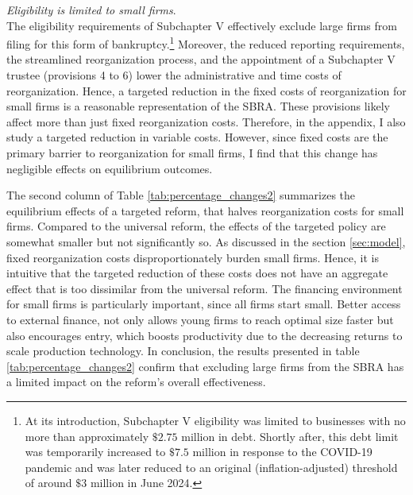 \documentclass[12pt]{article}
\begin{document}
\noindent \textit{Eligibility is limited to small firms}. \\ 
The eligibility requirements of Subchapter V effectively exclude large firms from filing for this form of bankruptcy.\footnote{At its introduction, Subchapter V eligibility was limited to businesses with no more than approximately $\$2.75$ million in debt. Shortly after, this debt limit was temporarily increased to $\$7.5$ million in response to the COVID-19 pandemic and was later reduced to an original (inflation-adjusted) threshold of around $\$3$ million in June 2024.} Moreover, the reduced reporting requirements, the streamlined reorganization process, and the appointment of a Subchapter V trustee (provisions 4 to 6) lower the administrative and time costs of reorganization. Hence, a targeted reduction in the fixed costs of reorganization for small firms is a reasonable representation of the SBRA. These provisions likely affect more than just fixed reorganization costs. Therefore, in the appendix, I also study a targeted reduction in variable costs. However, since fixed costs are the primary barrier to reorganization for small firms, I find that this change has negligible effects on equilibrium outcomes.

The second column of Table \ref{tab:percentage_changes2} summarizes the equilibrium effects of a targeted reform, that halves reorganization costs for small firms. Compared to the universal reform, the effects of the targeted policy are somewhat smaller but not significantly so. As discussed in the section \ref{sec:model}, fixed reorganization costs disproportionately burden small firms. Hence, it is intuitive that the targeted reduction of these costs does not have an aggregate effect that is too dissimilar from the universal reform. The financing environment for small firms is particularly important, since all firms start small. Better access to external finance, not only allows young firms to reach optimal size faster but also encourages entry, which boosts productivity due to the decreasing returns to scale production technology. In conclusion, the results presented in table \ref{tab:percentage_changes2} confirm that excluding large firms from the SBRA has a limited impact on the reform's overall effectiveness. 
\end{document}
